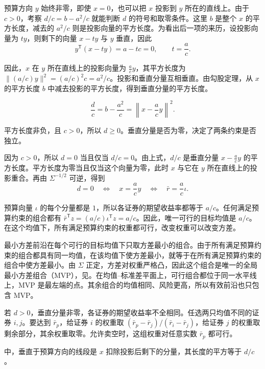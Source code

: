 \begin{solution}[label-content={证明},blank-type=none]
预算方向 $y$ 始终非零，即使 $x=0$，也可以把 $x$ 投影到 $y$ 所在的直线上。由于 $c>0$，考察 $d/c=b-a^2/c$ 就能判断 $d$ 的符号和取零条件。这里 $b$ 是整个 $x$ 的平方长度，减去的 $a^2/c$ 则是投影向量的平方长度。为看出后一项的来历，设投影向量为 $ty$，则剩下的向量 $x-ty$ 与 $y$ 垂直，因此
\[
 y^{\mathsf T}(x-ty)=a-tc=0,
 \qquad t=\frac ac.
\]

因此，$x$ 在 $y$ 所在直线上的投影向量为 $\frac{a}{c}y$，其平方长度为 $\lVert(a/c)y\rVert^2=(a/c)^2c=a^2/c$。投影和垂直分量互相垂直。由勾股定理，从 $x$ 的平方长度 $b$ 中减去投影的平方长度，得到垂直分量的平方长度。

\[
 \frac{d}{c}=b-\frac{a^2}{c}
 =\left\lVert x-\frac ac y\right\rVert^2.
\]

平方长度非负，且 $c>0$，所以 $d\ge0$。垂直分量是否为零，决定了两条约束是否独立。

因为 $c>0$，所以 $d=0$ 当且仅当 $d/c=0$。由上式，$d/c$ 是垂直分量 $x-\frac ac y$ 的平方长度。平方长度为零当且仅当这个向量为零，此时 $x$ 与它在 $y$ 所在直线上的投影重合。再由 $\Sigma^{-1/2}$ 可逆，得到
\[
 d=0
 \quad\Longleftrightarrow\quad x=\frac ac y
 \quad\Longleftrightarrow\quad \bar r=\frac ac\iota.
\]

预算向量 $\iota$ 的每个分量都是 $1$，所以各证券的期望收益率都等于 $a/c$。任何满足预算约束的组合都有 $\bar r^{\mathsf T}z=(a/c)\iota^{\mathsf T}z=a/c$。因此，唯一可行的目标均值是 $a/c$。在这个均值下，所有满足预算约束的权重都可行，改变权重可以改变方差。

最小方差前沿在每个可行的目标均值下只取方差最小的组合。由于所有满足预算约束的组合都具有同一均值，在该均值下使方差最小，就等于在所有满足预算约束的组合中使方差最小。由 $\Sigma$ 正定，方差对权重严格凸，因此这个组合是唯一的全局最小方差组合（MVP），见。在均值--标准差平面上，可行组合都位于同一水平线上，MVP 是最左端的点。其余组合的均值相同、风险更高，所以有效前沿也只包含 MVP。

若 $d>0$，垂直分量非零，各证券的期望收益率不全相同。任选两只均值不同的证券 $i,j$。要达到 $\bar r_p$，给证券 $i$ 的权重取 $(\bar r_p-\bar r_j)/(\bar r_i-\bar r_j)$，给证券 $j$ 的权重取剩余部分，其余权重取零。允许卖空时，这组权重对任意实数 $\bar r_p$ 都可行。
\end{solution}

 中，垂直于预算方向的线段是 $x$ 扣除投影后剩下的分量，其长度的平方等于 $d/c$。

\noindent\begin{minipage}{\linewidth}
 \centering
 \renewcommand{\thewjFigure}{\thechapter.S\arabic{wjFigure}}%
 \par
\end{minipage}



